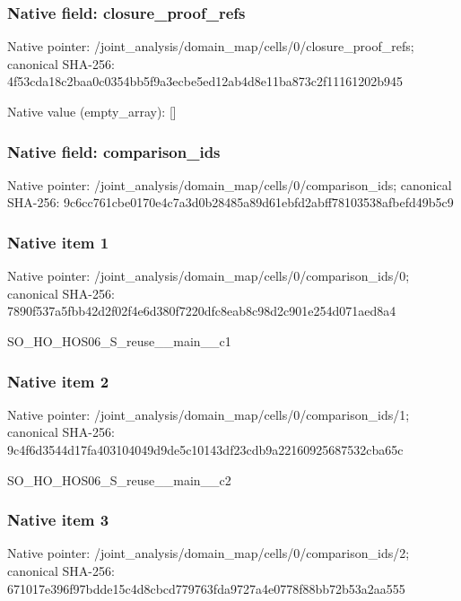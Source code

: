 \documentclass[10pt,a4paper]{article}
\begin{document}
\subsubsection{Native field: closure\_\allowbreak{}proof\_\allowbreak{}refs}
Native pointer: /joint\_\allowbreak{}analysis/domain\_\allowbreak{}map/cells/0/closure\_\allowbreak{}proof\_\allowbreak{}refs; canonical SHA-256: 4f53cda18c2baa0c0354bb5f9a3ecbe5ed12ab4d8e11ba873c2f11161202b945

Native value (empty\_\allowbreak{}array): []

\subsubsection{Native field: comparison\_\allowbreak{}ids}
Native pointer: /joint\_\allowbreak{}analysis/domain\_\allowbreak{}map/cells/0/comparison\_\allowbreak{}ids; canonical SHA-256: 9c6cc761cbe0170e4c7a3d0b28485a89d61ebfd2abff78103538afbefd49b5c9

\subsubsection{Native item 1}
Native pointer: /joint\_\allowbreak{}analysis/domain\_\allowbreak{}map/cells/0/comparison\_\allowbreak{}ids/0; canonical SHA-256: 7890f537a5fbb42d2f02f4e6d380f7220dfc8eab8c98d2c901e254d071aed8a4

\begingroup\raggedright\sloppy SO\_\allowbreak{}HO\_\allowbreak{}HOS06\_\allowbreak{}S\_\allowbreak{}reuse\_\allowbreak{}\_\allowbreak{}main\_\allowbreak{}\_\allowbreak{}c1\par\endgroup

\subsubsection{Native item 2}
Native pointer: /joint\_\allowbreak{}analysis/domain\_\allowbreak{}map/cells/0/comparison\_\allowbreak{}ids/1; canonical SHA-256: 9c4f6d3544d17fa403104049d9de5c10143df23cdb9a22160925687532cba65c

\begingroup\raggedright\sloppy SO\_\allowbreak{}HO\_\allowbreak{}HOS06\_\allowbreak{}S\_\allowbreak{}reuse\_\allowbreak{}\_\allowbreak{}main\_\allowbreak{}\_\allowbreak{}c2\par\endgroup

\subsubsection{Native item 3}
Native pointer: /joint\_\allowbreak{}analysis/domain\_\allowbreak{}map/cells/0/comparison\_\allowbreak{}ids/2; canonical SHA-256: 671017e396f97bdde15c4d8cbcd779763fda9727a4e0778f88bb72b53a2aa555
\end{document}
